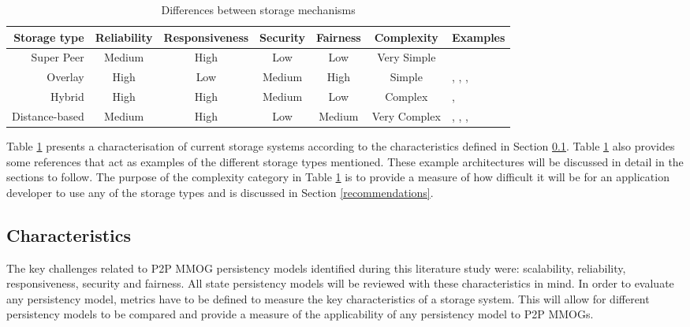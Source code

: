\documentclass[10pt,a4paper,journal,cspaper,compsoc]{IEEEtran}
\begin{document}
\begin{table}[htbp]
\centering
\begin{tabular}{|r|c|c|c|c|c|l|}
\hline
Storage type & Reliability & Responsiveness & Security & Fairness & Complexity & Examples\\
\hline
Super Peer & Medium & High & Low & Low & Very Simple & \cite{knutsson_p2p_first}\\
Overlay & High & Low & Medium & High & Simple & \cite{Douglas05enablingmassively}, \cite{using_freenet_storage},
\cite{Fan_phd}, \cite{past_storage_focus}\\
Hybrid & High & High & Medium & Low & Complex & \cite{zoned_federation}, \cite{hybrid_storage1}\\
Distance-based & Medium & High & Low & Medium & Very Complex & \cite{Buyukkaya_voronoi_state_management}, \cite{Hu_voronoi_IM},
\cite{colyseus_distance_based}, \cite{solipsis}\\
\hline
\end{tabular}
\caption{Differences between storage mechanisms} \label{tab_storage}
\end{table}
%
Table \ref{tab_storage} presents a characterisation of current storage systems according to the characteristics defined in Section
\ref{key_challenges_cm}. Table \ref{tab_storage} also provides some references that act as examples of the different storage types mentioned. These
example architectures will be discussed in detail in the sections to follow. The purpose of the complexity category in Table \ref{tab_storage} is to
provide a measure of how difficult it will be for an application developer to use any of the storage types and is discussed in Section
\ref{recommendations}.

\subsection{Characteristics}
\label{key_challenges_cm}

The key challenges related to P2P MMOG persistency models identified during this literature study were: scalability, reliability, responsiveness,
security and fairness. All state persistency models will be reviewed with these characteristics in mind. In order to evaluate any persistency model,
metrics have to be defined to measure the key characteristics of a storage system. This will allow for different persistency models to be compared
and provide a measure of the applicability of any persistency model to P2P MMOGs.
\end{document}
